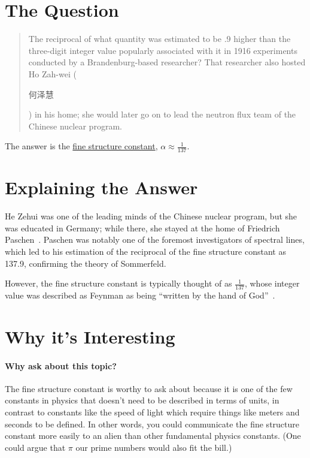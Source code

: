 \documentclass{article}
\newcommand{\hezehui}{
  \begin{CJK*}{UTF8}{gbsn}
    何泽慧
\end{CJK*}
}
\begin{document}
\section{The Question}

\begin{quote}
The reciprocal of what quantity was estimated to be .9 higher than the
three-digit integer value popularly associated with it in 1916 experiments
conducted by a Brandenburg-based researcher?  That researcher also hosted Ho Zah-wei (\hezehui{}) in his
home; she would later go on to lead the neutron flux team of the Chinese nuclear program.
\end{quote}

The answer is the \underline{fine structure constant}, $\alpha \approx \frac{1}{137}$.

\section{Explaining the Answer}

He Zehui was one of the leading minds of the Chinese nuclear program,
but she was educated in Germany; while there, she stayed at the home
of Friedrich Paschen~\citep{cern-11}.  Paschen was notably one of the
foremost investigators of spectral lines, which led to his estimation
of the reciprocal of the fine structure constant as 137.9, confirming
the theory of Sommerfeld.

However, the fine structure constant is typically thought of as
$\frac{1}{137}$, whose integer value was described as Feynman as being
``written by the hand of God''~\citep{feynman-98}.

\section{Why it's Interesting}

\paragraph{Why ask about this topic?}
The fine structure constant is worthy to ask about because it is one
of the few constants in physics that doesn't need to be described in
terms of units, in contrast to constants like the speed of light which
require things like meters and seconds to be defined.  In other words,
you could communicate the fine structure constant more easily to an
alien than other fundamental physics constants.  (One could argue that
$\pi$ our prime numbers would also fit the bill.)
\end{document}
